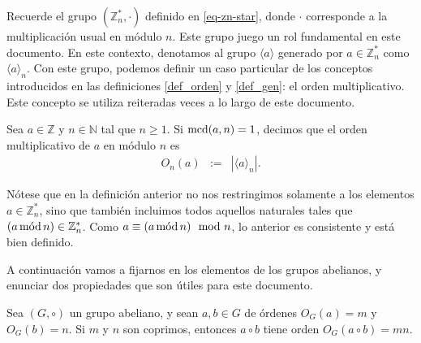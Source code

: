 

Recuerde el grupo $(\mathbb{Z}_n^*,\cdot)$ definido en \ref{eq-zn-star}, donde $\cdot$ corresponde a la
multiplicación usual en módulo $n$. Este grupo juego un rol fundamental en este documento. 
En este contexto, denotamos al grupo $\langle a \rangle$ generado por
$a\in \mathbb{Z}_n^*$ como $\langle a\rangle_n$.
Con este grupo, podemos definir un caso particular de los conceptos
introducidos en las definiciones \ref{def_orden} y \ref{def_gen}: el
orden multiplicativo. Este concepto se utiliza reiteradas veces a lo
largo de este documento.


\begin{definition}\label{def_ord_mult}
	 Sea $a\in \mathbb{Z}$ y $n\in \mathbb{N}$ tal que $n \geq 1$. Si $\MCD(a,n)=1$, decimos que el orden multiplicativo de $a$ en módulo $n$ es
         \begin{eqnarray*}
         O_n(a) & := & |\langle a\rangle _n|.
         \end{eqnarray*}
\end{definition}
Nótese que en la definición anterior no nos restringimos solamente a
los elementos $a\in\mathbb{Z}_n^*$, sino que también incluimos todos
aquellos naturales tales que $(a \mods n) \in \mathbb{Z}_n^*$. Como $a \equiv (a\mods n) \modl n$, lo anterior es consistente y está bien
definido.

A continuación vamos a fijarnos en los elementos de los grupos abelianos, y enunciar dos propiedades que son útiles para este documento.
\begin{theorem}\label{orden del producto coprimos}
	Sea $(G,\circ)$ un grupo abeliano, y sean $a,b\in G$ de órdenes $O_G(a)=m$ y $O_G(b)=n$. Si $m$ y $n$ son coprimos, entonces $a\circ b$ tiene orden $O_G(a\circ b)=mn$.
\end{theorem}

